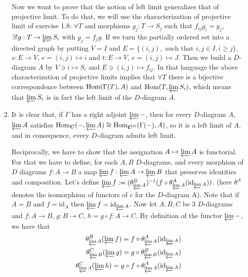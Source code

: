 \begin{sol}
\begin{enumerate}[label=\alph*)]
		Now we want to prove that the notion of left limit generalizes that of projective limit. To do that, we will use the characterization of projective limit of exercise 1.8: $\forall T$ and morphisms $g_j: T \to S_j$ such that $f_{ij} g_i = g_j$, $\exists! g: T \to \varprojlim S_i$ with $g_j = f_j g$. If we turn the partially ordered set into a directed graph by putting $V = I$ and $E = \{(i,j), \text{ such that } i,j \in I, i \geq j\}$, $s:E \to V, \, e = (i,j) \mapsto i$ and $t: E \to V, \, e= (i,j) \mapsto J$. Then we build a $D$-diagram $A$ by $V \ni i \mapsto S_i$ and $E \ni (i,j) \mapsto f_{ij}$. In that language the above characterization of projective limits implies that $\forall T$ there is a bijective correspondence between $\mathrm{Hom}(\Gamma(T), A)$ and $\mathrm{Hom}(T, \varprojlim S_i)$, which means that $\varprojlim S_i$ is in fact the left limit of the $D$-diagram $A$.

		\item It is clear that, if $\Gamma$ has a right adjoint $\varprojlim -$, then for every $D$-diagram $A$, $\varprojlim A$ satisfies $\mathrm{Hom}_{\boldsymbol{C}}(-, \varprojlim A) \cong \mathrm{Hom}_{\boldsymbol{C}^D}(\Gamma(-), A)$, so it is a left limit of $A$, and in consequence, every $D$-diagram admits left limit.

		Reciprocally, we have to show that the assignation $A \mapsto \varprojlim A$ is functorial. For that we have to define, for each $A, B$ $D$-diagrams, and every morphism of $D$ diagrams $f: A \to B$ a map $\varprojlim f: \varprojlim A \to \varprojlim B$ that preserves identities and composition. Let's define $\varprojlim f:= (\theta^B_{\varprojlim A})^{-1} (f \circ \theta_{\varprojlim A}^A(\text{id}_{\varprojlim A}))$. (here $\theta^A$ denotes the isomorphism of functors of c for the $D$-diagram A). Note that if $A = B$ and $f = \text{id}_A$ then $\varprojlim f = \text{id}_{\varprojlim A}$. Now let $A, B, C$ be 3 $D$-diagrams and $f: A \to B$, $g: B \to C$, $h = g \circ f: A \to C$. By definition of the functor $\varprojlim -$, we have that 
		\begin{align*}
			\theta^B_{\varprojlim A}(\varprojlim f) =  f \circ \theta_{\varprojlim A}^A(\text{id}_{\varprojlim A}) \\
			\theta^C_{\varprojlim B}(\varprojlim g) =  g \circ \theta_{\varprojlim B}^B(\text{id}_{\varprojlim A}) \\
			\theta^C_{\varprojlim A}(\varprojlim h) =  g \circ f \circ \theta_{\varprojlim A}^A(\text{id}_{\varprojlim A}) 
		\end{align*}


\end{enumerate}
\end{sol}

